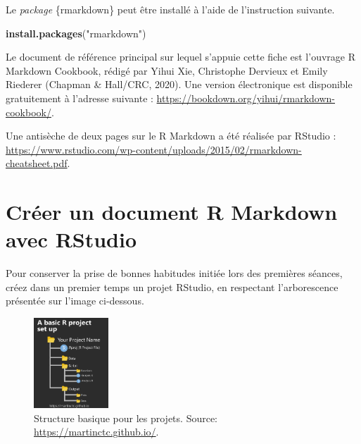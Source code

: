 \documentclass[
  11pt,
]{book}
\newenvironment{Shaded}{\begin{snugshade}}{\end{snugshade}}
\newcommand{\FunctionTok}[1]{\textcolor[rgb]{0.13,0.29,0.53}{\textbf{#1}}}
\newcommand{\NormalTok}[1]{#1}
\newcommand{\StringTok}[1]{\textcolor[rgb]{0.31,0.60,0.02}{#1}}
\numberwithin{equation}{section}
\numberwithin{countremarque}{section}
\begin{document}
Le \emph{package} \{rmarkdown\} peut être installé à l'aide de l'instruction suivante.

\begin{Shaded}
\begin{Highlighting}[]
\FunctionTok{install.packages}\NormalTok{(}\StringTok{"rmarkdown"}\NormalTok{)}
\end{Highlighting}
\end{Shaded}

Le document de référence principal sur lequel s'appuie cette fiche est l'ouvrage R Markdown Cookbook, rédigé par Yihui Xie, Christophe Dervieux et Emily Riederer (Chapman \& Hall/CRC, 2020). Une version électronique est disponible gratuitement à l'adresse suivante : \url{https://bookdown.org/yihui/rmarkdown-cookbook/}.

Une antisèche de deux pages sur le R Markdown a été réalisée par RStudio : \url{https://www.rstudio.com/wp-content/uploads/2015/02/rmarkdown-cheatsheet.pdf}.

\hypertarget{cruxe9er-un-document-r-markdown-avec-rstudio}{%
\section{Créer un document R Markdown avec RStudio}\label{cruxe9er-un-document-r-markdown-avec-rstudio}}

Pour conserver la prise de bonnes habitudes initiée lors des premières séances, créez dans un premier temps un projet RStudio, en respectant l'arborescence présentée sur l'image ci-dessous.

\begin{figure}
\centering
\includegraphics[width=0.25\textwidth,height=\textheight]{figs/project_tree_structure.png}
\caption{Structure basique pour les projets. Source: \url{https://martinctc.github.io/}.}
\end{figure}
\end{document}
